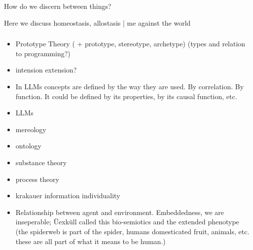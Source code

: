 \section{}
\subsection{}
How do we discern between things?

Here we discuss homeostasis, allostasis | me against the world
\subsubsection{}
\begin{itemize}
    \item Prototype Theory ( + prototype, stereotype, archetype) (types and relation to programming?)
    \item intension extension?
    \item In LLMs concepts are defined by the way they are used. By correlation. By function. It could be defined by its properties, by its causal function, etc. 
    \item LLMs
    \item mereology
    \item ontology
\end{itemize}

\begin{itemize}
    \item substance theory
    \item process theory
    \item krakauer information individuality
    \item Relationship between agent and environment. Embeddedness, we are inseperable; Üexküll called this bio-semiotics and the extended phenotype (the spiderweb is part of the spider, humans domesticated fruit, animals, etc. these are all part of what it means to be human.)
\end{itemize}




\subsubsection{}

